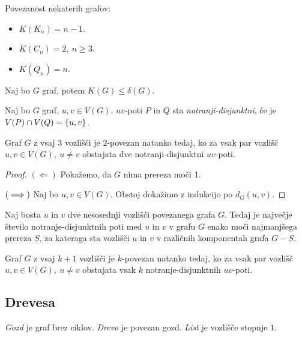 \begin{primer}
    Povezanost nekaterih grafov:
    \begin{itemize}
        \item $K(K_n) = n-1$.
        \item $K(C_n) = 2, \ n \geq 3$.
        \item $K(Q_n) = n$.
    \end{itemize}
\end{primer}

\begin{opomba}
    Naj bo $G$ graf, potem $K(G) \leq \delta(G)$.
\end{opomba}

\begin{definicija}
    Naj bo $G$ graf, $u,v \in V(G)$. $uv$-poti $P$ in $Q$ sta \emph{notranji-disjunktni}, če je $V(P) \cap V(Q) = \left\{u,v\right\}$.
\end{definicija}

\begin{izrek}[Whitney]
    Graf $G$ z vsaj \(3\) vozlišči je $2$-povezan natanko tedaj, ko za vsak par vozlišč $u, v \in V(G), \ u \neq v$ obstajata dve notranji-disjunktni $uv$-poti.
\end{izrek}

\begin{proof}
    $(\Leftarrow)$ Pokažemo, da $G$ nima prereza moči 1.

    $(\implies)$ Naj bo $u,v \in V(G)$. Obstoj dokažimo z indukcijo po $d_G(u,v)$.
\end{proof}

\begin{izrek}[Menger]
    Naj bosta \(u\) in \(v\) dve nesosednji vozlišči povezanega grafa \(G\). Tedaj je največje število notranje-disjunktnih poti med \(u\) in \(v\) v grafu \(G\) enako moči najmanjšega prereza \(S\), za kateraga sta vozlišči \(u\) in \(v\) v različnih komponentah grafa \(G - S\).
\end{izrek}

\begin{posledica}
    Graf $G$ z vsaj \(k+1\) vozlišči je $k$-povezan natanko tedaj, ko za vsak par vozlišč $u, v \in V(G), \ u \neq v$ obstajata vsak \(k\) notranje-disjunktnih $uv$-poti.
\end{posledica}

\newpage
\subsection{Drevesa}
\begin{definicija}
    \emph{Gozd} je graf brez ciklov. \emph{Drevo} je povezan gozd. \emph{List} je vozlišče stopnje $1$.
\end{definicija}

